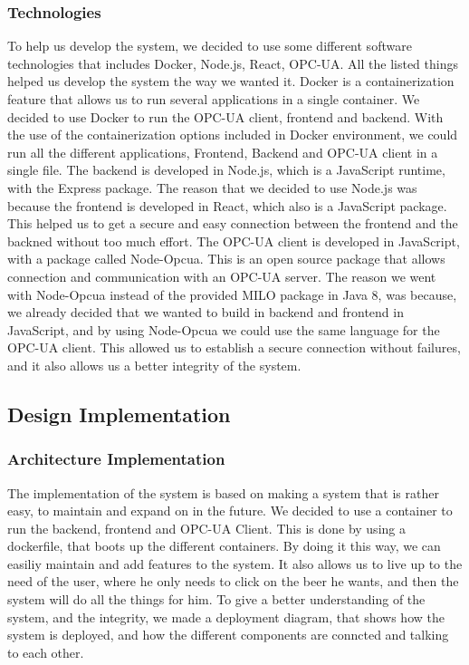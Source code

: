 \subsubsection{Technologies}
To help us develop the system, we decided to use some different software technologies that includes Docker, Node.js, React, OPC-UA. All the listed things helped us develop the system the way we wanted it.
Docker is a containerization feature that allows us to run several applications in a single container. We decided to use Docker to run the OPC-UA client, frontend and backend. 
With the use of the containerization options included in Docker environment, we could run all the different applications, Frontend, Backend and OPC-UA client in a single file. \newline
The backend is developed in Node.js, which is a JavaScript runtime, with the Express package. The reason that we decided to use Node.js was because the frontend is developed in React, which also is a JavaScript package. This helped us to get a secure and easy connection between the frontend and the backned without too much effort. The OPC-UA client is developed in JavaScript, with a package called Node-Opcua. This is an open source package that allows connection and communication with an OPC-UA server.\newline
The reason we went with Node-Opcua instead of the provided MILO package in Java 8, was because, we already decided that we wanted to build in backend and frontend in JavaScript, and by using Node-Opcua we could use the same language for the OPC-UA client. This allowed us to establish a secure connection without failures, and it also allows us a better integrity of the system. \newline

\subsection{Design Implementation}

\subsubsection{Architecture Implementation}
The implementation of the system is based on making a system that is rather easy, to maintain and expand on in the future. We decided to use a container to run the backend, frontend and OPC-UA Client. This is done by using a dockerfile, that boots up the different containers.
By doing it this way, we can easiliy maintain and add features to the system. It also allows us to live up to the need of the user, where he only needs to click on the beer he wants, and then the system will do all the things for him. \newline
To give a better understanding of the system, and the integrity, we made a deployment diagram, that shows how the system is deployed, and how the different components are conncted and talking to each other. \newline

